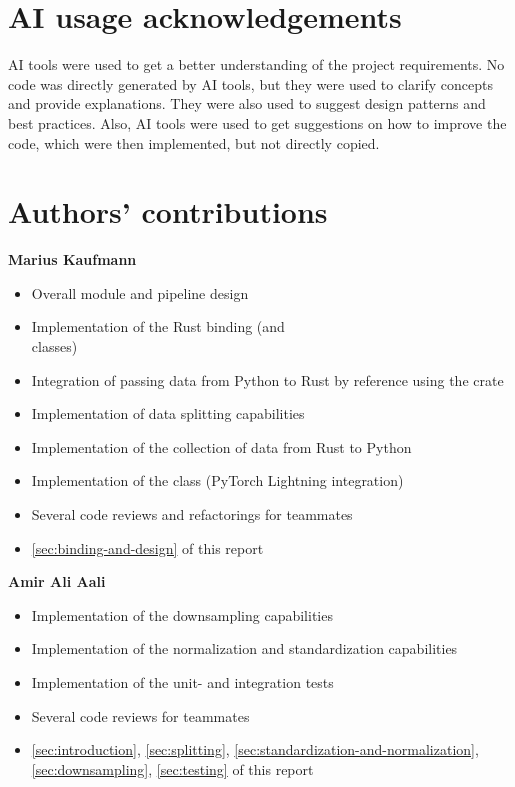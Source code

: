 \documentclass[review]{AIM_report}
\begin{document}
\newpage
\section{AI usage acknowledgements}

AI tools were used to get a better understanding of the project requirements. No code was directly generated by AI tools, but they were used to clarify concepts and provide explanations. They were also used to suggest design patterns and best practices. Also, AI tools were used to get suggestions on how to improve the code, which were then implemented, but not directly copied.

\newpage
\section{Authors' contributions}

\textbf{Marius Kaufmann}
\begin{itemize}
    \item Overall module and pipeline design
    \item Implementation of the Rust binding (\forecastingDataSet and \\\classificationDataSet classes)
    \item Integration of passing data from Python to Rust by reference using the \numpy crate
    \item Implementation of data splitting capabilities
    \item Implementation of the collection of data from Rust to Python
    \item Implementation of the \rustDM class (PyTorch Lightning integration)
    \item Several code reviews and refactorings for teammates
    \item \autoref{sec:binding-and-design} of this report
\end{itemize}

\textbf{Amir Ali Aali}
\begin{itemize}
    \item Implementation of the downsampling capabilities
    \item Implementation of the normalization and standardization capabilities
    \item Implementation of the unit- and integration tests
    \item Several code reviews for teammates
    \item \autoref{sec:introduction}, \autoref{sec:splitting}, \autoref{sec:standardization-and-normalization}, \autoref{sec:downsampling}, \autoref{sec:testing} of this report
\end{itemize}
\end{document}
